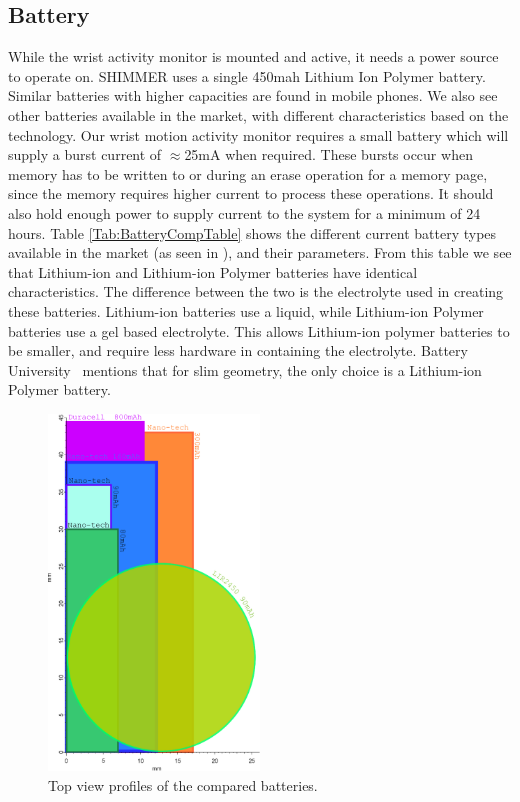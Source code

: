 \subsection{Battery}
\label{Sec:Battery}

While the wrist activity monitor is mounted and active, it needs a power source to operate on.
SHIMMER \cite{Web:ShimmerHome} uses a single 450mah Lithium Ion Polymer battery.
Similar batteries with higher capacities are found in mobile phones. We also see other batteries available in the market,
with different characteristics based on the technology.
Our wrist motion activity monitor requires a small battery which will supply a burst current of $\approx$25mA when required.
These bursts occur when memory has to be written to or during an erase operation for a memory page,
since the memory requires higher current to process these operations.
It should also hold enough power to supply current to the system for a minimum of 24 hours.
Table \ref{Tab:BatteryCompTable} shows the different current battery types available in the market (as seen in \cite{Web:BatteryTable}), and their parameters. From this table we see that Lithium-ion and Lithium-ion Polymer batteries have identical characteristics.
The difference between the two is the electrolyte used in creating these batteries.
Lithium-ion batteries use a liquid,
while Lithium-ion Polymer batteries use a gel based electrolyte.
This allows Lithium-ion polymer batteries to be smaller,
and require less hardware in containing the electrolyte.
Battery University~\cite{Web:BatteryTable} mentions that for slim geometry, the only choice is a Lithium-ion Polymer battery.
\begin{figure}
\begin{center}
\includegraphics[width=0.5\textwidth]{images/battcompare.eps}
\caption{Top view profiles of the compared batteries.}
\label{Fig:BattComp}
\end{center}
\end{figure}
